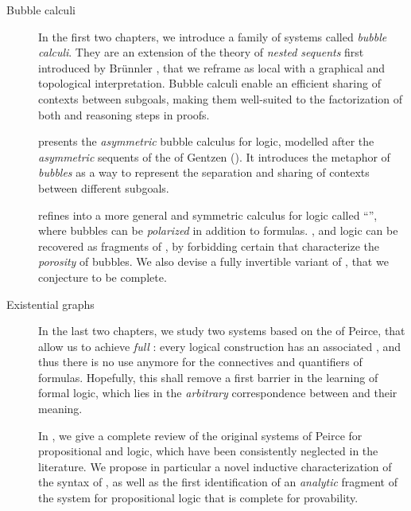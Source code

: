 \begin{description}
  \item[Bubble calculi] In the first two chapters, we introduce a family of
  systems called \emph{bubble calculi}. They are an extension of the theory of
  \emph{nested sequents} first introduced by Brünnler
  , that we reframe as local  with
  a graphical and topological interpretation. Bubble calculi enable an efficient
  sharing of contexts between subgoals, making them well-suited to the
  factorization of both  and  reasoning steps in proofs.

   presents the \emph{asymmetric} bubble calculus  for
   logic, modelled after the \emph{asymmetric} sequents of the
     of Gentzen (). It
  introduces the metaphor of \emph{bubbles} as a way to  represent the
  separation and sharing of contexts between different subgoals.

   refines  into a more general and symmetric
  calculus for  logic called ``'', where bubbles can be
  \emph{polarized} in addition to formulas. , 
  and  logic can be recovered as fragments of ,
  by forbidding certain  that characterize the \emph{porosity} of
  bubbles. We also devise a fully invertible variant of , that we
  conjecture to be complete.
  
  \item[Existential graphs] In the last two chapters, we study two systems based
  on the  of Peirce, that allow us to achieve \emph{full
  }: every logical construction has an associated , and thus there
  is no use anymore for the connectives and quantifiers of  formulas.
  Hopefully, this shall remove a first barrier in the learning of formal logic,
  which lies in the \emph{arbitrary} correspondence between  and their
  meaning.

  In , we give a complete review of the original  systems of
  Peirce for propositional and   logic, which have
  been consistently neglected in the  literature. We propose in
  particular a novel inductive characterization of the syntax of , as
  well as the first identification of an \emph{analytic} fragment of the system
  for propositional logic that is complete for provability.


\end{description}
